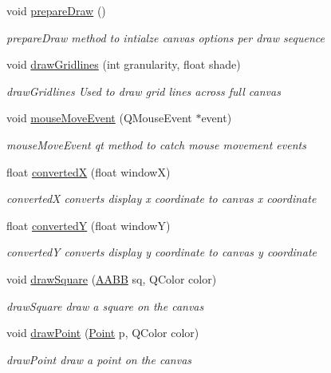 \begin{DoxyCompactItemize}
\item 
void \hyperlink{class_canvas_a0b546aa7d55d00f82b4db59ab4ab9cee}{prepare\+Draw} ()
\begin{DoxyCompactList}\small\item\em prepare\+Draw method to intialze canvas options per draw sequence \end{DoxyCompactList}\item 
void \hyperlink{class_canvas_ad9205f4414565884776edc5f421954a8}{draw\+Gridlines} (int granularity, float shade)
\begin{DoxyCompactList}\small\item\em draw\+Gridlines Used to draw grid lines across full canvas \end{DoxyCompactList}\item 
void \hyperlink{class_canvas_a9fb4b83a1067ddc2aa04676f51dc5a47}{mouse\+Move\+Event} (Q\+Mouse\+Event $\ast$event)
\begin{DoxyCompactList}\small\item\em mouse\+Move\+Event qt method to catch mouse movement events \end{DoxyCompactList}\item 
float \hyperlink{class_canvas_afddf8ae4dcfb9557ae557b9f998f5d5a}{convertedX} (float windowX)
\begin{DoxyCompactList}\small\item\em convertedX converts display x coordinate to canvas x coordinate \end{DoxyCompactList}\item 
float \hyperlink{class_canvas_a12cbc7e3a2cb3bbb6278052d49a90313}{convertedY} (float windowY)
\begin{DoxyCompactList}\small\item\em convertedY converts display y coordinate to canvas y coordinate \end{DoxyCompactList}\item 
void \hyperlink{class_canvas_a78ce810ea0004c4f3fa9ee9d92996875}{draw\+Square} (\hyperlink{class_a_a_b_b}{A\+A\+BB} sq, Q\+Color color)
\begin{DoxyCompactList}\small\item\em draw\+Square draw a square on the canvas \end{DoxyCompactList}\item 
void \hyperlink{class_canvas_ad7cf8e6e93765586808ac744d888dbdc}{draw\+Point} (\hyperlink{class_point}{Point} p, Q\+Color color)
\begin{DoxyCompactList}\small\item\em draw\+Point draw a point on the canvas \end{DoxyCompactList}\item 

\end{DoxyCompactItemize}

